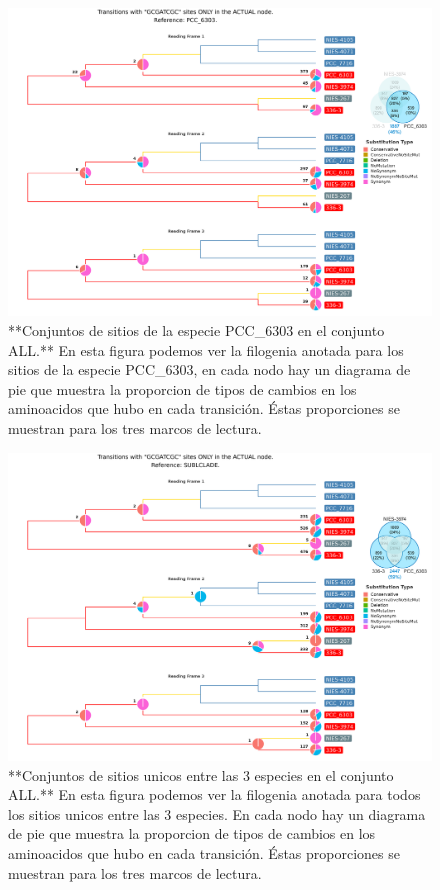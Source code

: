 \documentclass[
]{book}
\begin{document}
\begin{figure}

{\centering \includegraphics[width=1.2\linewidth]{Clados/Calothrix_B/figures/A/GCGATCGC/Actual/PCC_6303_Actual_A_tree} 

}

\caption{**Conjuntos de sitios de la especie PCC\_6303 en el conjunto ALL.** En esta figura podemos ver la filogenia anotada para los sitios de la especie PCC\_6303, en cada nodo hay un diagrama de pie que muestra la proporcion de tipos de cambios en los aminoacidos que hubo en cada transición. Éstas proporciones se muestran para los tres marcos de lectura.}\label{fig:FIG15x}
\end{figure}

\begin{figure}

{\centering \includegraphics[width=1.2\linewidth]{Clados/Calothrix_B/figures/A/GCGATCGC/Actual/SUBCLADE_Actual_A_tree} 

}

\caption{**Conjuntos de sitios unicos entre las 3 especies en el conjunto ALL.** En esta figura podemos ver la filogenia anotada para todos los sitios unicos entre las 3 especies. En cada nodo hay un diagrama de pie que muestra la proporcion de tipos de cambios en los aminoacidos que hubo en cada transición. Éstas proporciones se muestran para los tres marcos de lectura.}\label{fig:FIG16x}
\end{figure}
\end{document}
